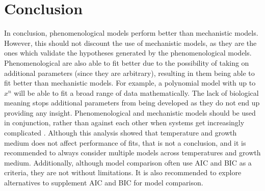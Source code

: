 \documentclass[11pt, a4paper, titlepage]{article}
\begin{document}
\section{Conclusion}
In conclusion, phenomenological models perform better than mechanistic models. However, this should not discount the use of mechanistic models, as they are the ones which validate the hypotheses generated by the phenomenological models. Phenomenological are also able to fit better due to the possibility of taking on additional parameters (since they are arbitrary), resulting in them being able to fit better than mechanistic models. For example, a polynomial model with up to $x^n$ will be able to fit a broad range of data mathematically. The lack of biological meaning stops additional parameters from being developed as they do not end up providing any insight. Phenomenological and mechanistic models should be used in conjunction, rather than against each other when systems get increasingly complicated \parencite{mcm2013}. Although this analysis showed that temperature and growth medium does not affect performance of fits, that is not a conclusion, and it is recommended to always consider multiple models across temperatures and growth medium. Additionally, although model comparison often use AIC and BIC as a criteria, they are not without limitations. It is also recommended to explore alternatives to supplement AIC and BIC for model comparison.

\newpage
\printbibliography
\end{document}
